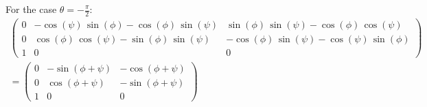 \documentclass[a4paper]{scrreprt}
\begin{document}
For the case $\theta=-\frac{\pi}{2}$: 
\begin{gather}
 	\left(\begin{array}{ccc} 
 	0 &  -\cos\left(\psi\right)\,\sin\left(\phi 
 	\right)-\cos\left(\phi 
 	\right)\,\sin\left(\psi\right) & \sin\left(\phi 
 	\right)\,\sin\left(\psi\right)-\cos\left(\phi 
 	\right)\,\cos\left(\psi\right)\\ 
 	0 &  \cos\left(\phi \right)\,\cos\left(\psi\right)-\sin\left(\phi 
 	\right)\,\sin\left(\psi\right) & -\cos\left(\phi 
\right)\,\sin\left(\psi\right)-\cos\left(\psi\right)\,\sin\left(\phi
	 \right)\\
	 1 &  	0 & 0 
 	\end{array}\right) \\
	 	= 
	 	\left(\begin{array}{ccc} 
	 	0 &  -\sin(\phi+\psi) & -\cos(\phi+\psi) \\ 
	 	0 &  \cos(\phi+\psi) & -\sin(\phi+\psi) \\
		1 &  	0 & 0 
 	\end{array}\right)
\end{gather}

%
\end{document}
